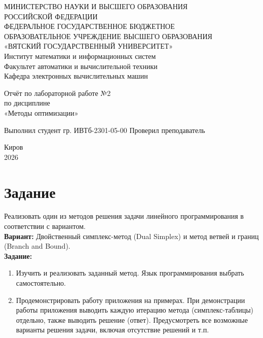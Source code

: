 \documentclass[oneside,a4paper,14pt]{extarticle}
\begin{document}
\newpage\thispagestyle{empty}
\begin{center}
	МИНИСТЕРСТВО НАУКИ И ВЫСШЕГО ОБРАЗОВАНИЯ\\
	РОССИЙСКОЙ ФЕДЕРАЦИИ\\
	ФЕДЕРАЛЬНОЕ ГОСУДАРСТВЕННОЕ БЮДЖЕТНОЕ\\
	ОБРАЗОВАТЕЛЬНОЕ УЧРЕЖДЕНИЕ ВЫСШЕГО ОБРАЗОВАНИЯ\\
	«ВЯТСКИЙ ГОСУДАРСТВЕННЫЙ УНИВЕРСИТЕТ»\\
	Институт математики и информационных систем\\
	Факультет автоматики и вычислительной техники\\
	Кафедра электронных вычислительных машин
\end{center}
\vspace{20mm}
\begin{center}
	Отчёт по лабораторной работе №2\\
	по дисциплине\\
	«Методы оптимизации»\\
\end{center}
\vfill
Выполнил студент гр. ИВТб-2301-05-00 \hfill
{}
Проверил преподаватель\hfill
{}
\vfill
\begin{center}
	Киров\\
	2026
\end{center}
\newpage
\setcounter{page}{1}
\tableofcontents
\newpage

\section*{Задание}
Реализовать один из методов решения задачи линейного программирования в соответствии с вариантом.\\

\textbf{Вариант:} Двойственный симплекс-метод (Dual Simplex) и метод ветвей и границ (Branch and Bound).\\

\textbf{Задание:}
\begin{enumerate}
	\item Изучить и реализовать заданный метод. Язык программирования выбрать самостоятельно.
	\item Продемонстрировать работу приложения на примерах. При демонстрации работы приложения выводить каждую итерацию метода (симплекс-таблицы) отдельно, также выводить решение (ответ). Предусмотреть все возможные варианты решения задачи, включая отсутствие решений и т.п.
\end{enumerate}
\end{document}
